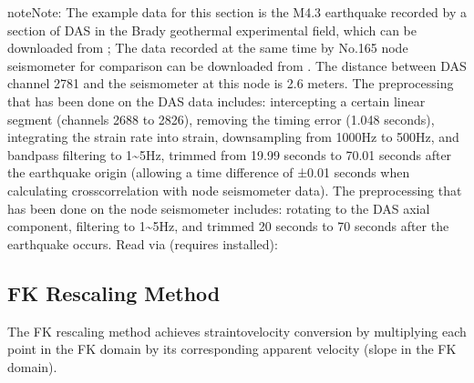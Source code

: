 \documentclass[letterpaper,10pt,english]{sphinxmanual}
\begin{document}
\begin{sphinxadmonition}{note}{Note:}
\sphinxAtStartPar
The example data for this section is the M4.3 earthquake recorded by a section of DAS in the Brady geothermal experimental field, which can be downloaded from ; The data recorded at the same time by No.165 node seismometer for comparison can be downloaded from . The distance between DAS channel 2781 and the seismometer at this node is 2.6 meters. The preprocessing that has been done on the DAS data includes: intercepting a certain linear segment (channels 2688 to 2826), removing the timing error (1.048 seconds), integrating the strain rate into strain, downsampling from 1000Hz to 500Hz, and bandpass filtering to 1\textasciitilde{}5Hz, trimmed from 19.99 seconds to 70.01 seconds after the earthquake origin (allowing a time difference of ±0.01 seconds when calculating cross\sphinxhyphen{}correlation with node seismometer data). The preprocessing that has been done on the node seismometer includes: rotating to the DAS axial component, filtering to 1\textasciitilde{}5Hz, and trimmed 20 seconds to 70 seconds after the earthquake occurs. Read via (requires  installed):

\begin{sphinxVerbatim}[commandchars=\\\{\}]
 
   
  
  
\end{sphinxVerbatim}
\end{sphinxadmonition}


\subsection{FK Rescaling Method}
\label{\detokenize{Strain-velocity Conversion:fk-rescaling-method}}\label{\detokenize{Strain-velocity Conversion:id1}}
\sphinxAtStartPar
The FK rescaling method achieves strain\sphinxhyphen{}to\sphinxhyphen{}velocity conversion by multiplying each point in the FK domain by its corresponding apparent velocity (slope in the FK domain).
\end{document}
